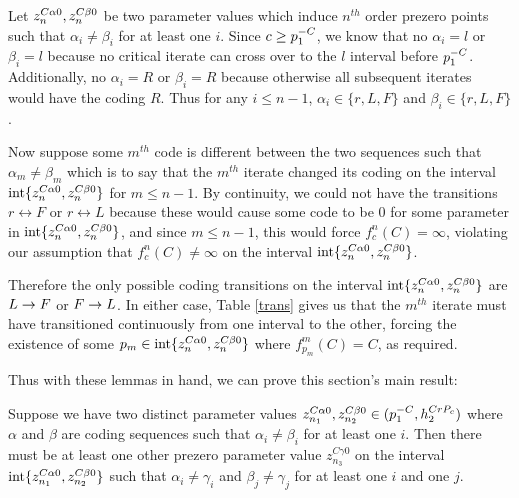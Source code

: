 		\begin{myproof}
			Let $z_n^{C\alpha 0}, z_n^{C\beta 0}$ be two parameter values which induce $n^{th}$ order prezero points such that $\alpha_i \neq \beta_i$ for at least one $i$. Since $c \geq p^{-C}_1$, we know that no $\alpha_i = l$ or $\beta_i = l$ because no critical iterate can cross over to the $l$ interval before $p^{-C}_1$. Additionally, no $\alpha_i = R$ or $\beta_i = R$ because otherwise all subsequent iterates would have the coding $R$. Thus for any $i \leq n -1$, $\alpha_i \in \{r, L, F\}$ and $\beta_i \in \{r, L, F\}$.

			Now suppose some $m^{th}$ code is different between the two sequences such that $\alpha_m \neq \beta_m$ which is to say that the $m^{th}$ iterate changed its coding on the interval $\text{int}\{z_n^{C\alpha 0},z_n^{C\beta 0}\}$ for $m \leq n-1$. By continuity, we could not have the transitions $r \leftrightarrow F$ or $r \leftrightarrow L$ because these would cause some code to be 0 for some parameter in $\text{int}\{z_n^{C\alpha 0},z_n^{C\beta 0}\}$, and since $m \leq n-1$, this would force $f^n_c(C) = \infty$, violating our assumption that $f_c^n(C) \neq \infty$ on the interval $\text{int}\{z_n^{C\alpha 0},z_n^{C\beta 0}\}$.

			Therefore the only possible coding transitions on the interval $\text{int}\{z_n^{C\alpha 0},z_n^{C\beta 0}\}$ are $L \rightarrow F$ or $F \rightarrow L$. In either case, Table \ref{trans} gives us that the $m^{th}$ iterate must have transitioned continuously from one interval to the other, forcing the existence of some $p_m \in \text{int}\{z_n^{C\alpha 0},z_n^{C\beta 0}\}$ where $f^m_{p_m} (C) = C$, as required.
		\end{myproof}

		Thus with these lemmas in hand, we can prove this section's main result:

		\begin{myprop}\label{mainprop}

			Suppose we have two distinct parameter values $z_{n_1}^{C\alpha0}, z_{n_2}^{C\beta0} \in (p^{-C}_1, h^{CrP_c}_2)$ where $\alpha$ and $\beta$ are coding sequences such that $\alpha_i \neq \beta_i$ for at least one $i$. Then there must be at least one other prezero parameter value $z_{n_3}^{C\gamma0}$ on the interval $\text{int}\{z_{n_1}^{C\alpha0},z_{n_2}^{C\beta0}\}$ such that $\alpha_i \neq \gamma_i$ and $\beta_j \neq \gamma_j$ for at least one $i$ and one $j$.

		\end{myprop}

